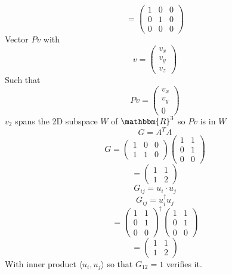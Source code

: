 \documentclass[12pt]{article}
\begin{document}
\begin{enumerate}
$$ = \left( \begin{array}{ccc} 1 & 0 & 0 \\ 0 & 1 & 0 \\ 0 & 0 & 0 \end{array} \right)$$
Vector $Pv$ with 
$$ v = \left( \begin{array}{ccc} v_x \\ v_y \\ v_z \end{array} \right)$$
Such that 
$$ Pv = \left( \begin{array}{ccc} v_x \\ v_y \\ 0 \end{array} \right)$$
$v_2$ spans the 2D subspace $W$ of $\mathbbm{R}^3$ so $Pv$ is in $W$
$$ G = A^T A $$
$$ G = \left( \begin{array}{ccc} 1 & 0 & 0 \\ 1 & 1 & 0 \end{array} \right) \left( \begin{array}{ccc} 1 & 1 \\ 0 & 1 \\ 0 & 0 \end{array} \right)$$
$$ = \left( \begin{array}{ccc} 1 & 1 \\ 1 & 2 \end{array} \right) $$
$$ G_{ij} = u_i \cdot u_j $$
$$ G_{ij} = u_i^\dagger u_j $$
$$ =  \left( \begin{array}{ccc} 1 & 1 \\ 0 & 1 \\ 0 & 0 \end{array} \right)^\dagger  \left( \begin{array}{ccc} 1 & 1 \\ 0 & 1 \\ 0 & 0 \end{array} \right) $$
$$ = \left( \begin{array}{ccc} 1 & 1 \\ 1 & 2 \end{array} \right) $$
With inner product $\langle u_i , u_j \rangle$ so that $G_{12} = 1$ verifies it. 



\end{enumerate}
\end{document}
